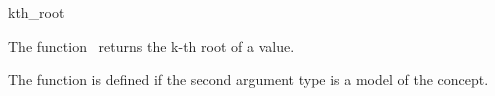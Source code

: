 \begin{ccRefFunction}{kth_root}

\ccDefinition

The function \ccRefName\ returns the k-th root of a value.

The function is defined if the second argument type 
is a model of the  concept. 


{}


\ccSeeAlso

\\
\\


\end{ccRefFunction}

